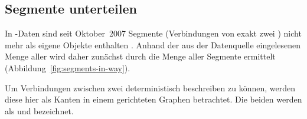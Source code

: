 \documentclass[../main/thesis.tex]{subfiles}
\begin{document}




\subsection{Segmente unterteilen}
\label{ch:split-algorithm}

In \osm-Daten sind seit Oktober~2007 Segmente (Verbindungen von exakt zwei ) nicht mehr als eigene Objekte enthalten .
Anhand der aus der Datenquelle eingelesenen Menge aller  wird daher zunächst durch  die Menge aller Segmente ermittelt (Abbildung~\ref{fig:segments-in-way}).


Um Verbindungen zwischen zwei  deterministisch beschreiben zu können, werden diese hier als Kanten in einem gerichteten Graphen betrachtet.
Die beiden  werden als  und  bezeichnet.
\end{document}
